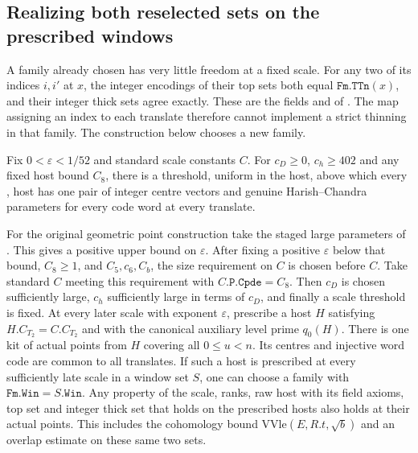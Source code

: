\subsection{Realizing both reselected sets on the prescribed windows}
\label{scope:reselected-realization}

A family already chosen has very little freedom at a fixed scale. For any
two of its indices \(i,i'\) at \(x\), the integer encodings of their top
sets both equal \(\mathtt{Fm.TTn}(x)\), and their integer thick sets agree
exactly. These are the fields  and
 of . The map assigning an
index to each translate therefore cannot implement a strict thinning in
that family. The construction below chooses a new family.

\begin{proposition}
\label{scope:reselected-hosts}
Fix \(0<\varepsilon<1/52\) and standard scale constants \(C\).
For \(c_D\ge0\), \(c_h\ge402\) and any fixed host bound \(C_8\), there is
a threshold, uniform in the host, above which every ,
 host has one pair of integer centre vectors and genuine
Harish--Chandra parameters for every code word at every translate.

For the original geometric point construction take the staged large
parameters of . This gives a positive upper bound on
\(\varepsilon\). After fixing a positive \(\varepsilon\) below that bound,
\(C_8\ge 1\), and \(C_5,c_6,C_b\),
the size requirement on \(C\) is chosen before \(C\). Take standard
\(C\) meeting this requirement with \(C.\mathtt{P.Cpde}=C_8\). Then \(c_D\) is
chosen sufficiently large, \(c_h\) sufficiently large in terms of
\(c_D\), and finally a scale threshold is fixed. At every later scale
with exponent \(\varepsilon\), prescribe a  host \(H\) satisfying
\(H.C_{T_2}=C.C_{T_2}\) and  with the canonical auxiliary
level prime \(q_0(H)\). There is one kit of actual points from \(H\) covering
all \(0\le u<n\). Its centres and injective word code are common to all
translates. If such a host is prescribed at every sufficiently late scale
in a window set \(S\), one can choose a family with
\(\mathtt{Fm.Win}=S.\mathtt{Win}\). Any property of the scale, ranks,
raw host with its field axioms, top set and integer thick set that holds
on the prescribed hosts also holds at their actual points. This includes the cohomology bound
\(\mathrm{VVle}(E,R.t,\sqrt b)\) and an overlap estimate on these same
two sets.
\end{proposition}

